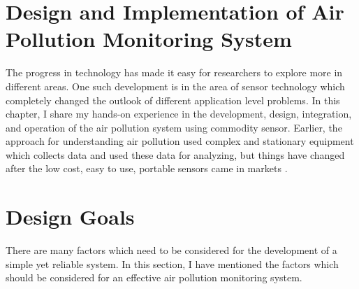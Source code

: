 \documentclass[11pt]{article}
\begin{document}
\section*{Design and Implementation of Air Pollution Monitoring System}

The progress in technology has made it easy for researchers to explore more in different areas. One such development is in the area of sensor technology which completely changed the outlook of different application level problems. In this chapter, I share my hands-on experience in the development, design, integration, and operation of the air pollution system using commodity sensor. Earlier, the approach for understanding air pollution used complex and stationary equipment which collects data and used these data for analyzing, but things have changed after the low cost, easy to use, portable sensors came in markets \cite{Snyder2013}. 

\section*{Design Goals}

There are many factors which need to be considered for the development of a simple yet reliable system. In this section, I have mentioned the factors which should be considered for an effective air pollution monitoring system.
\end{document}
